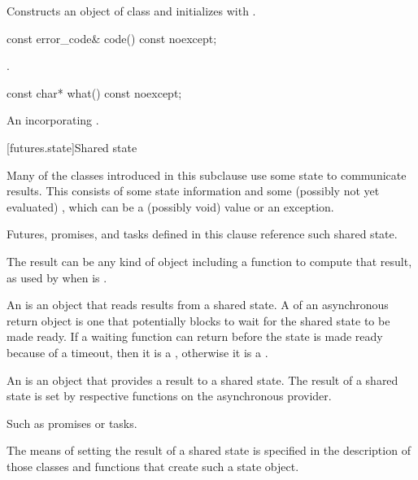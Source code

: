 \begin{itemdescr}
\pnum
\effects
Constructs an object of class 
and initializes  with .
\end{itemdescr}

%
\begin{itemdecl}
const error_code& code() const noexcept;
\end{itemdecl}

\begin{itemdescr}
\pnum
\returns
{}.
\end{itemdescr}

%
\begin{itemdecl}
const char* what() const noexcept;
\end{itemdecl}

\begin{itemdescr}
\pnum
\returns
An \ntbs{} incorporating .
\end{itemdescr}

[futures.state]{Shared state}

\pnum
Many of the classes introduced in this subclause use some state to communicate results. This
 consists of some state information and some (possibly not
yet evaluated) , which can be a (possibly void) value or an exception.
\begin{note}
Futures, promises, and tasks defined in this clause reference such shared state.
\end{note}

\pnum
\begin{note}
The result can be any kind of object including a function to compute that result,
as used by  when  is .
\end{note}

\pnum
An  is an object that reads results from a
shared state. A  of an asynchronous return object is one
that potentially blocks to wait for the shared state to be made
ready.
If a waiting function can return before the state is made ready because of a
timeout, then it is a , otherwise
it is a .

\pnum
An  is an object that provides a result to a shared
state.
The result of a shared state is set by
respective functions on the asynchronous provider.
\begin{note}
Such as promises or tasks.
\end{note}
The means of setting the result of a shared state is specified
in the description of those classes and functions that create such a state object.

